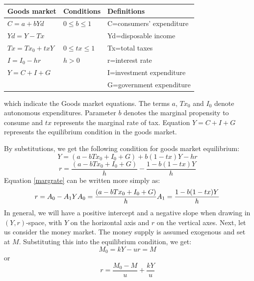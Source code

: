 \documentclass[a4paper,11pt]{report}
\begin{document}
\begin{table}[]
\begin{tabular}{|l|l|l|}
\hline
Goods market    & Conditions        & Definitions              \\ \hline
$C=a+bYd$       & $0\leq b\leq 1$   & C=consumers' expenditure \\ \hline
$Yd=Y-Tx$       &                   & Yd=disposable income     \\ \hline
$Tx=Tx_{0}+txY$ & $0\leq tx \leq 1$ & Tx=total taxes           \\ \hline
$I=I_{0}-hr$    & $h>0$             & r=interest rate          \\ \hline
$Y=C+I+G$       &                   & I=investment expenditure \\ \hline
                &                   & G=government expenditure \\ \hline
\end{tabular}
\end{table}
which indicate the Goods market equations. The terms $a$, $Tx_{0}$ and $I_{0}$ denote autonomous expenditures. Parameter $b$ denotes the marginal propensity to consume and $tx$ represents the marginal rate of tax. Equation $Y=C+I+G$ represents the equilibrium condition in the goods market.\par
By substitutions, we get the following condition for goods market equilibrium:
\begin{equation}\label{incomeislm}
 Y=(a-bTx_{0}+I_{0}+G)+b(1-tx)Y-hr
\end{equation}
\begin{equation}\label{margrate}
 r=\frac{(a-bTx_{0}+I_{0}+G)}{h}-\frac{1-b(1-tx)Y}{h}
\end{equation}
Equation \eqref{margrate} can be written more simply as:
\begin{equation}\label{simple mr}
 r=A_{0}-A_{1}Y \\
 A_{0}=\frac{(a-bTx_{0}+I_{0}+G)}{h} \\
 A_{1}=\frac{1-b(1-tx)Y}{h}
\end{equation}
In general, we will have a positive intercept and a negative slope when drawing in $(Y,r)$-space, with $Y$ on the horizontal axis and $r$ on the vertical axes.
Next, let us consider the money market. The money supply is assumed exogenous and set at $M$. Substituting this into the equilibrium condition, we get:
\begin{equation*}
 M_{0}=kY-ur=M
\end{equation*}
or
\begin{equation}\label{money mr}
 r=\frac{M_{0}-M}{u}+\frac{kY}{u}
\end{equation}
\end{document}
